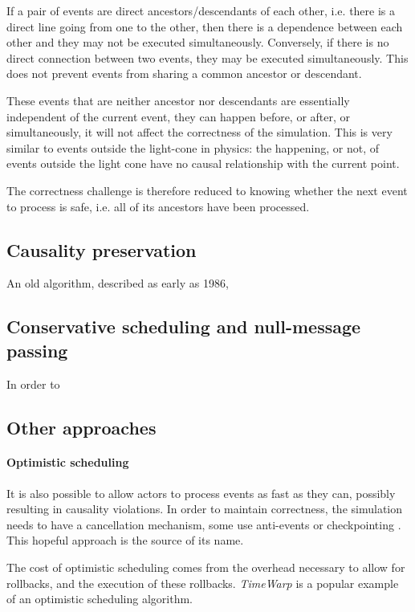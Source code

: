 If a pair of events are direct ancestors/descendants of each other, i.e. there is a direct line going from one to the other, then there is a dependence between each other and they may not be executed simultaneously.
Conversely, if there is no direct connection between two events, they may be executed simultaneously.
This does not prevent events from sharing a common ancestor or descendant.

These events that are neither ancestor nor descendants are essentially independent of the current event, they can happen before, or after, or simultaneously, it will not affect the correctness of the simulation.
This is very similar to events outside the light-cone in physics: the happening, or not, of events outside the light cone have no causal relationship with the current point.

The correctness challenge is therefore reduced to knowing whether the next event to process is safe, i.e. all of its ancestors have been processed.

\subsection{Causality preservation} \label{causality}

An old algorithm, described as early as 1986\cite{misra_distributed_1986}, 

\subsection{Conservative scheduling and null-message passing} \label{null-messages}

In order to 

\subsection{Other approaches}
\paragraph{Optimistic scheduling} \label{optimistic-scheduling}

It is also possible to allow actors to process events as fast as they can, possibly resulting in causality violations.
In order to maintain correctness, the simulation needs to have a cancellation mechanism, some use anti-events \cite{} or checkpointing \cite{}. %
This hopeful approach is the source of its name.

The cost of optimistic scheduling comes from the overhead necessary to allow for rollbacks, and the execution of these rollbacks.
\emph{TimeWarp} \cite{} is a popular example of an optimistic scheduling algorithm.

